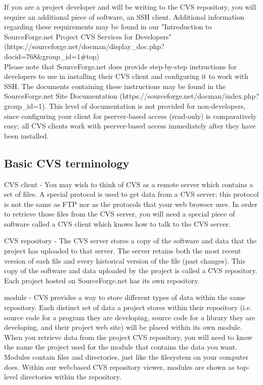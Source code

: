 If you are a project developer and will be writing to the CVS repository, you will require an additional piece of software, an SSH client. Additional information regarding these requirements may be found in our "Introduction to SourceForge.net Project CVS Services for Developers" (https://sourceforge.net/docman/display\_doc.php?docid=768\&group\_id=1\#top)\\

Please note that SourceForge.net does provide step-by-step instructions for developers to use in installing their CVS client and configuring it to work with SSH. The documents containing these instructions may be found in the SourceForge.net Site Documentation (https://sourceforge.net/docman/index.php?group\_id=1). This level of documentation is not provided for non-developers, since configuring your client for pserver-based access (read-only) is comparatively easy; all CVS clients work with pserver-based access immediately after they have been installed.\\

\subsection{Basic CVS terminology}

CVS client - You may wish to think of CVS as a remote server which contains a set of files. A special protocol is used to get data from a CVS server; this protocol is not the same as FTP nor as the protocols that your web browser uses. In order to retrieve those files from the CVS server, you will need a special piece of software called a CVS client which knows how to talk to the CVS server.

CVS repository - The CVS server stores a copy of the software and data that the project has uploaded to that server. The server retains both the most recent version of each file and every historical version of the file (past changes). This copy of the software and data uploaded by the project is called a CVS repository. Each project hosted on SourceForge.net has its own repository.

module - CVS provides a way to store different types of data within the same repository. Each distinct set of data a project stores within their repository (i.e. source code for a program they are developing, source code for a library they are developing, and their project web site) will be placed within its own module. When you retrieve data from the project CVS repository, you will need to know the name the project used for the module that contains the data you want. Modules contain files and directories, just like the filesystem on your computer does. Within our web-based CVS repository viewer, modules are shown as top-level directories within the repository.

